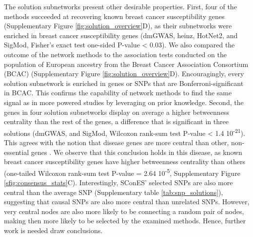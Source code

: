 \documentclass[twocolumn, 11pt, draft]{article}
\begin{document}
The solution subnetworks present other desirable properties. First, four of the methods succeeded at recovering known breast cancer susceptibility genes (Supplementary Figure \ref{fig:solution_overview}D), as their subnetworks were enriched in breast cancer susceptibility genes (dmGWAS, heinz, HotNet2, and SigMod, Fisher's exact test one-sided P-value < 0.03). We also compared the outcome of the network methods to the association tests conducted on the population of European ancestry from the Breast Cancer Association Consortium (BCAC) \cite{Michailidou2017} (Supplementary Figure \ref{fig:solution_overview}D). Encouragingly, every solution subnetwork is enriched in genes or SNPs that are Bonferroni-significant in BCAC. This confirms the capability of network methods to find the same signal as in more powered studies by leveraging on prior knowledge. Second, the genes in four solution subnetworks display on average a higher betweenness centrality than the rest of the genes, a difference that is significant in three solutions (dmGWAS, and SigMod, Wilcoxon rank-sum test P-value < 1.4 \texttimes{} 10\textsuperscript{-21}). This agrees with the notion that disease genes are more central than other, non-essential genes \cite{pinero_uncovering_2016}. We observe that this conclusion holds in this disease, as known breast cancer susceptibility genes have higher betweenness centrality than others (one-tailed Wilcoxon rank-sum test P-value = 2.64 \texttimes{} 10\textsuperscript{-5}, Supplementary Figure \ref{sfig:consensus_stats}C). Interestingly, SConES' selected SNPs are also more central than the average SNP (Supplementary table \ref{tab:snp_solutions}), suggesting that causal SNPs are also more central than unrelated SNPs. However, very central nodes are also more likely to be connecting a random pair of nodes, making then more likely to be selected by the examined methods. Hence, further work is needed draw conclusions.
\end{document}
